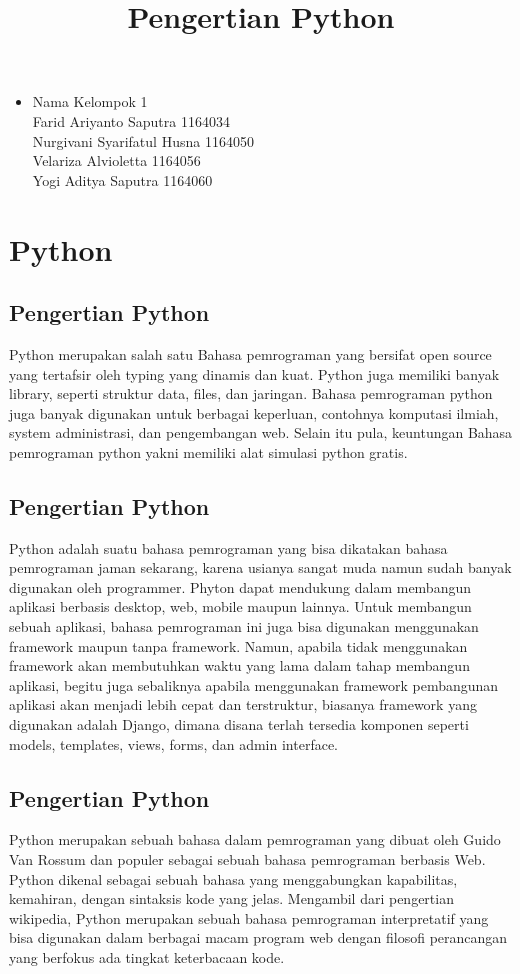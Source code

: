 \documentclass[12pt,a4paper]{article}
\begin{document}
\title{Pengertian Python}
\maketitle

\begin{itemize}
\item
Nama Kelompok 1\\
Farid Ariyanto Saputra 1164034\\
Nurgivani Syarifatul Husna 1164050\\
Velariza Alvioletta 1164056\\
Yogi Aditya Saputra 1164060 \\
\end{itemize}

\section{Python}
\subsection{Pengertian Python}
Python merupakan salah satu Bahasa pemrograman yang bersifat open source yang tertafsir oleh typing yang dinamis dan kuat. Python juga memiliki banyak library, seperti struktur data, files, dan jaringan. Bahasa pemrograman python juga banyak digunakan untuk berbagai keperluan, contohnya komputasi ilmiah, system administrasi, dan pengembangan web. Selain itu pula, keuntungan Bahasa pemrograman python yakni memiliki alat simulasi python gratis.
\subsection{Pengertian Python}
Python adalah suatu bahasa pemrograman yang bisa dikatakan bahasa pemrograman jaman sekarang, karena usianya sangat muda namun sudah banyak digunakan oleh programmer. Phyton dapat mendukung dalam membangun aplikasi berbasis desktop, web, mobile maupun lainnya. Untuk membangun sebuah aplikasi, bahasa pemrograman ini juga bisa digunakan menggunakan framework maupun tanpa framework. Namun, apabila tidak menggunakan framework akan membutuhkan waktu yang lama dalam tahap membangun aplikasi, begitu juga sebaliknya apabila menggunakan framework pembangunan aplikasi akan menjadi lebih cepat dan terstruktur, biasanya framework yang digunakan adalah Django, dimana disana terlah tersedia komponen seperti models, templates, views, forms, dan admin interface.
\subsection{Pengertian Python}
Python merupakan sebuah bahasa dalam pemrograman yang dibuat oleh Guido Van Rossum dan populer sebagai sebuah bahasa pemrograman berbasis Web. Python dikenal sebagai sebuah bahasa yang menggabungkan kapabilitas, kemahiran, dengan sintaksis kode yang jelas. Mengambil dari pengertian wikipedia, Python merupakan sebuah bahasa pemrograman interpretatif yang bisa digunakan dalam berbagai macam program web dengan filosofi perancangan yang berfokus ada tingkat keterbacaan kode.
\end{document}
